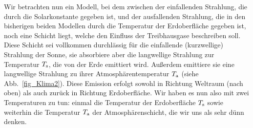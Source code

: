 Wir betrachten nun ein Modell, bei dem zwischen der einfallenden Strahlung,
die durch die Solarkonstante gegeben ist, und der ausfallenden Strahlung, die in
den bisherigen beiden Modellen durch die Temperatur der Erdoberfl\"ache
gegeben ist, noch eine Schicht liegt, welche den Einfluss der Treibhausgase
beschreiben soll. Diese Schicht sei vollkommen durchl\"assig f\"ur die einfallende
(kurzwellige) Strahlung der Sonne, sie absorbiere aber die langwellige Strahlung zur Temperatur $T_{\rm s}$,
die von der Erde emittiert wird. Au\ss erdem emittiere sie eine langwellige Strahlung zu ihrer
Atmosph\"arentemperatur $T_{\rm a}$ (siehe Abb.\ \ref{fig_Klima2}). Diese Emission erfolgt
sowohl in Richtung Weltraum (nach oben) als auch zur\"uck in Richtung Erdoberfl\"ache.
Wir haben es nun also mit zwei Temperaturen zu tun: einmal die Temperatur
der Erdoberfl\"ache $T_{\rm s}$ sowie weiterhin die Temperatur $T_{\rm a}$ der Atmosph\"arenschicht,
die wir uns als sehr d\"unn denken. 
 
